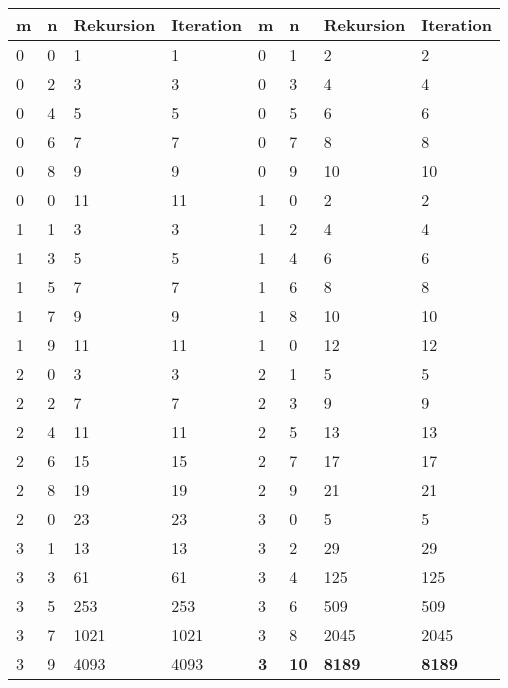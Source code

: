         \begin{longtable}{|p{0.5cm}|p{0.5cm}|p{2cm}|p{2cm} || p{0.5cm}|p{0.5cm}|p{2cm}|p{2cm}|}
            \hline
            \textbf{m} & \textbf{n} & \textbf{Rekursion} & \textbf{Iteration} & \textbf{m} & \textbf{n} & \textbf{Rekursion} & \textbf{Iteration} \\
            \hline
    		\endhead
            0 & 0 & 1 & 1 & 0 & 1 & 2 & 2 \\
            \hline
            0 & 2 & 3 & 3 & 0 & 3 & 4 & 4 \\
            \hline
            0 & 4 & 5 & 5 & 0 & 5 & 6 & 6 \\
            \hline
            0 & 6 & 7 & 7 & 0 & 7 & 8 & 8 \\
            \hline
            0 & 8 & 9 & 9 & 0 & 9 & 10 & 10 \\
            \hline
            0 & 0 & 11 & 11 & 1 & 0 & 2 & 2 \\
            \hline
            1 & 1 & 3 & 3 & 1 & 2 & 4 & 4 \\
            \hline
            1 & 3 & 5 & 5 & 1 & 4 & 6 & 6 \\
            \hline
            1 & 5 & 7 & 7 & 1 & 6 & 8 & 8 \\
            \hline
            1 & 7 & 9 & 9 & 1 & 8 & 10 & 10 \\
            \hline
            1 & 9 & 11 & 11 & 1 & 0 & 12 & 12 \\
            \hline
            2 & 0 & 3 & 3 & 2 & 1 & 5 & 5 \\
            \hline
            2 & 2 & 7 & 7 & 2 & 3 & 9 & 9 \\
            \hline
            2 & 4 & 11 & 11 & 2 & 5 & 13 & 13 \\
            \hline
            2 & 6 & 15 & 15 & 2 & 7 & 17 & 17 \\
            \hline
            2 & 8 & 19 & 19 & 2 & 9 & 21 & 21 \\
            \hline
            2 & 0 & 23 & 23 & 3 & 0 & 5 & 5 \\
            \hline
            3 & 1 & 13 & 13 & 3 & 2 & 29 & 29 \\
            \hline
            3 & 3 & 61 & 61 & 3 & 4 & 125 & 125 \\
            \hline
            3 & 5 & 253 & 253 & 3 & 6 & 509 & 509 \\
            \hline
            3 & 7 & 1021 & 1021 & 3 & 8 & 2045 & 2045 \\
            \hline
            3 & 9 & 4093 & 4093 & \textbf{3} & \textbf{10} & \textbf{8189} & \textbf{8189} \\
            \hline
        \end{longtable}
    \egroup
